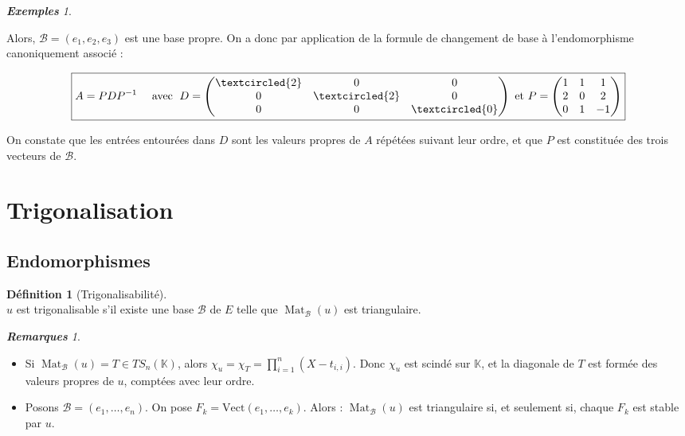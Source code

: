 \documentclass[12pt]{book}
\let\ensembleNombre\mathbb
\newcommand*\K{\ensuremath{\ensembleNombre{K}}}
\newcommand*\B{\ensuremath{\mathcal B}}
\DeclareMathOperator{\Mat}{Mat}
\theoremstyle{definition}
\newtheorem*{defi}{Définition}
\theoremstyle{remark}
\newtheorem*{rems}{\textbf{Remarques}}
\newtheorem*{exs}{\textbf{Exemples}}
\newenvironment{fdef}
  {\begin{mdframed}[roundcorner=10pt, linewidth=1pt]\begin{defi}}
  {\end{defi}\end{mdframed}}
\begin{document}
\begin{exs}
\begin{itemize}
	Alors, $\B = (e_1, e_2, e_3)$ est une base propre. On a donc par application de la formule de changement de base à l'endomorphisme canoniquement associé :
	
	\[ \boxed{ A = PDP^{-1} \quad\text{ avec }\; D = \begin{pmatrix} \textcircled{2} & 0 & 0 \\ 0 & \textcircled{2} & 0 \\ 0 & 0 & \textcircled{0} \end{pmatrix} \text{ et } P = \begin{pmatrix} 1 & 1 & 1 \\ 2 & 0 & 2 \\ 0 & 1 & -1 \end{pmatrix} } \]
	
	On constate que les entrées entourées dans $D$ sont les valeurs propres de $A$ répétées suivant leur ordre, et que $P$ est constituée des trois vecteurs de $\B$.
	\end{itemize}
	\end{exs}
	
	\section{Trigonalisation}
	\subsection{Endomorphismes}
	\begin{fdef}[Trigonalisabilité]\mbox{~}\\
	$u$ est trigonalisable s'il existe une base $\B$ de $E$ telle que $\Mat_\B(u)$ est triangulaire.
	\end{fdef}
	
	\begin{rems}\mbox{~}\\
	\begin{itemize}
	\item Si $\Mat_\B(u) = T \in TS_n(\K)$, alors $\chi_u = \chi_T = \prod_{i=1}^n (X - t_{i,i})$. Donc $\chi_u$ est scindé sur $\K$, et la diagonale de $T$ est formée des valeurs propres de $u$, comptées avec leur ordre.
	
	\item Posons $\B = (e_1, \ldots, e_n)$. On pose $F_k = \mathrm{Vect}(e_1, \ldots, e_k)$. Alors : $\Mat_\B(u)$ est triangulaire si, et seulement si, chaque $F_k$ est stable par $u$.
	\end{itemize}
	\end{rems}
	
\end{document}
